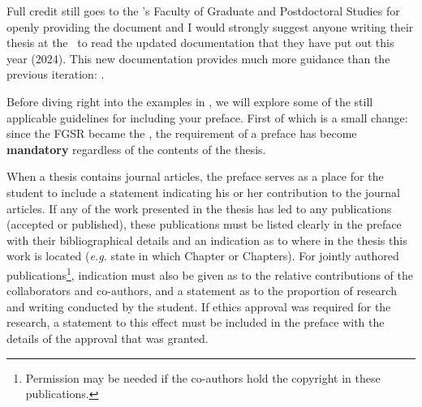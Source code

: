 			Full credit still goes to the \University's Faculty of Graduate and Postdoctoral Studies for openly providing the document and I would strongly suggest anyone writing their thesis at the \University\ to read the updated documentation that they have put out this year (2024).
			This new documentation provides much more guidance than the previous iteration: .
			
			
			Before diving right into the examples in , we will explore some of the still applicable guidelines for including your preface. First of which is a small change: since the FGSR became the \Fac, the requirement of a preface has become \textbf{mandatory} regardless of the contents of the thesis.
			
			When a thesis contains journal articles, the preface serves as a place for the student to include a statement indicating his or her contribution to the journal articles. 
			If any of the work presented in the thesis has led to any publications (accepted or published), these publications must be listed clearly in the preface with their bibliographical details and an indication as to where in the thesis this work is located (\textit{e.g.} state in which Chapter or Chapters). 
			For jointly authored publications\footnote{Permission may be needed if the co-authors hold the copyright in these publications.}, indication must also be given as to the relative contributions of the collaborators and co-authors, and a statement as to the proportion of research and writing conducted by the student.
			If ethics approval was required for the research, a statement to this effect must be included in the preface with the details of the approval that was granted. 

			
			
			
